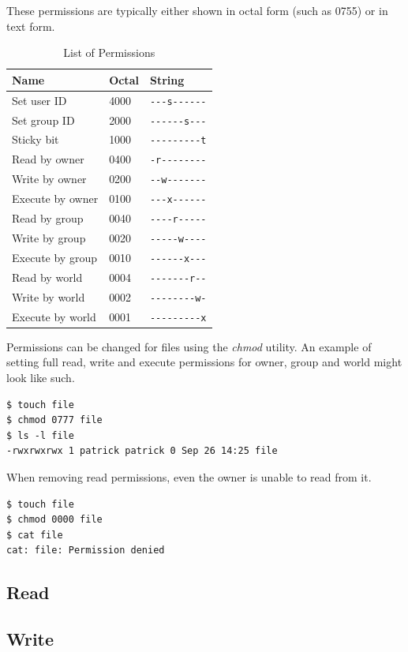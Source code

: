 \documentclass[a4paper]{article}
\begin{document}
These permissions are typically either shown in octal form (such as 0755) or in text form.

\begin{table}[!h]
\centering\caption{List of Permissions}
\begin{tabular}{@{}lll@{}}
\toprule
\textbf{Name} & \textbf{Octal} & \textbf{String}\\
\midrule
Set user ID      & 4000 & \verb|---s------|\\
Set group ID     & 2000 & \verb|------s---|\\
Sticky bit       & 1000 & \verb|---------t|\\
Read by owner    & 0400 & \verb|-r--------|\\
Write by owner   & 0200 & \verb|--w-------|\\
Execute by owner & 0100 & \verb|---x------|\\
Read by group    & 0040 & \verb|----r-----|\\
Write by group   & 0020 & \verb|-----w----|\\
Execute by group & 0010 & \verb|------x---|\\
Read by world    & 0004 & \verb|-------r--|\\
Write by world   & 0002 & \verb|--------w-|\\
Execute by world & 0001 & \verb|---------x|\\
\bottomrule  
\end{tabular}
\end{table}
Permissions can be changed for files using the \emph{chmod} utility. An example of setting full read, write and execute permissions for owner, group and world might look like such.

\begin{verbatim}
$ touch file
$ chmod 0777 file
$ ls -l file
-rwxrwxrwx 1 patrick patrick 0 Sep 26 14:25 file  
\end{verbatim}
When removing read permissions, even the owner is unable to read from it.

\begin{verbatim}
$ touch file
$ chmod 0000 file
$ cat file
cat: file: Permission denied
\end{verbatim}

\subsection{Read}

\subsection{Write}
\end{document}
